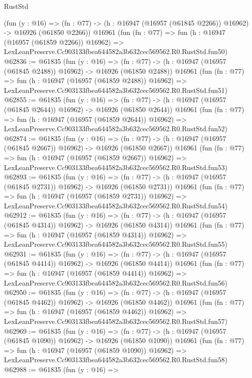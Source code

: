 \begin{lexlean}{RustStd}
\begin{coremodule}
    (fun (y : @16) =>
    (fn : @77) -> (h : @16947 (@16957 (@61845 @2266)) @16962) -> @16926 (@61850 @2266))
    @16961
    (fun (fn : @77) =>
    fun (h : @16947 (@16957 (@61859 @2266)) @16962) =>
    LexLeanPreserve.Cc903133fbea644582a3b632cec569562.R0.RustStd.fun50)
@62836 := @61835
    (fun (y : @16) =>
    (fn : @77) -> (h : @16947 (@16957 (@61845 @2488)) @16962) -> @16926 (@61850 @2488))
    @16961
    (fun (fn : @77) =>
    fun (h : @16947 (@16957 (@61859 @2488)) @16962) =>
    LexLeanPreserve.Cc903133fbea644582a3b632cec569562.R0.RustStd.fun51)
@62855 := @61835
    (fun (y : @16) =>
    (fn : @77) -> (h : @16947 (@16957 (@61845 @2644)) @16962) -> @16926 (@61850 @2644))
    @16961
    (fun (fn : @77) =>
    fun (h : @16947 (@16957 (@61859 @2644)) @16962) =>
    LexLeanPreserve.Cc903133fbea644582a3b632cec569562.R0.RustStd.fun52)
@62874 := @61835
    (fun (y : @16) =>
    (fn : @77) -> (h : @16947 (@16957 (@61845 @2667)) @16962) -> @16926 (@61850 @2667))
    @16961
    (fun (fn : @77) =>
    fun (h : @16947 (@16957 (@61859 @2667)) @16962) =>
    LexLeanPreserve.Cc903133fbea644582a3b632cec569562.R0.RustStd.fun53)
@62893 := @61835
    (fun (y : @16) =>
    (fn : @77) -> (h : @16947 (@16957 (@61845 @2731)) @16962) -> @16926 (@61850 @2731))
    @16961
    (fun (fn : @77) =>
    fun (h : @16947 (@16957 (@61859 @2731)) @16962) =>
    LexLeanPreserve.Cc903133fbea644582a3b632cec569562.R0.RustStd.fun54)
@62912 := @61835
    (fun (y : @16) =>
    (fn : @77) -> (h : @16947 (@16957 (@61845 @4314)) @16962) -> @16926 (@61850 @4314))
    @16961
    (fun (fn : @77) =>
    fun (h : @16947 (@16957 (@61859 @4314)) @16962) =>
    LexLeanPreserve.Cc903133fbea644582a3b632cec569562.R0.RustStd.fun55)
@62931 := @61835
    (fun (y : @16) =>
    (fn : @77) -> (h : @16947 (@16957 (@61845 @4414)) @16962) -> @16926 (@61850 @4414))
    @16961
    (fun (fn : @77) =>
    fun (h : @16947 (@16957 (@61859 @4414)) @16962) =>
    LexLeanPreserve.Cc903133fbea644582a3b632cec569562.R0.RustStd.fun56)
@62950 := @61835
    (fun (y : @16) =>
    (fn : @77) -> (h : @16947 (@16957 (@61845 @4462)) @16962) -> @16926 (@61850 @4462))
    @16961
    (fun (fn : @77) =>
    fun (h : @16947 (@16957 (@61859 @4462)) @16962) =>
    LexLeanPreserve.Cc903133fbea644582a3b632cec569562.R0.RustStd.fun57)
@62969 := @61835
    (fun (y : @16) =>
    (fn : @77) -> (h : @16947 (@16957 (@61845 @1090)) @16962) -> @16926 (@61850 @1090))
    @16961
    (fun (fn : @77) =>
    fun (h : @16947 (@16957 (@61859 @1090)) @16962) =>
    LexLeanPreserve.Cc903133fbea644582a3b632cec569562.R0.RustStd.fun58)
@62988 := @61835
    (fun (y : @16) =>

\end{coremodule}
\end{lexlean}

